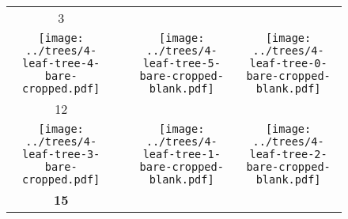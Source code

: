 \documentclass[border=10pt,varwidth=30cm]{standalone}
\newcommand{\pltwidth}{0.1}
\begin{document}
\begin{figure}
    \setlength\arrayrulewidth{2pt}
    \centering
    \begin{tabular}{@{}cccc@{}}
        3 & &  &  \\
        \texttt{[image: ../trees/4-leaf-tree-4-bare-cropped.pdf]}
        & &
        \texttt{[image: ../trees/4-leaf-tree-5-bare-cropped-blank.pdf]}
        &
        \texttt{[image: ../trees/4-leaf-tree-0-bare-cropped-blank.pdf]} \\[1ex]
        12 & &  &  \\
        \texttt{[image: ../trees/4-leaf-tree-3-bare-cropped.pdf]}
        & &
        \texttt{[image: ../trees/4-leaf-tree-1-bare-cropped-blank.pdf]}
        &
        \texttt{[image: ../trees/4-leaf-tree-2-bare-cropped-blank.pdf]} \\
        {\Large \textbf{15}} & & \multicolumn{2}{c}{ } \\
    \end{tabular}
\end{figure}
\end{document}
